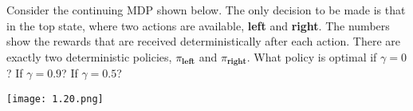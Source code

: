
\begin{exercise}[Exercise 3.22]

Consider the continuing MDP shown below.
The only decision to be made is that in the top state, where two actions are available, \textbf{left} and \textbf{right}.
The numbers show the rewards that are received deterministically after each action.
There are exactly two deterministic policies, $\pi_\textbf{left}$ and $\pi_\textbf{right}$.
What policy is optimal if $\gamma = 0$?
If $\gamma = 0.9$?
If $\gamma = 0.5$?

\begin{center}
    \texttt{[image: 1.20.png]}
\end{center}

\end{exercise}


